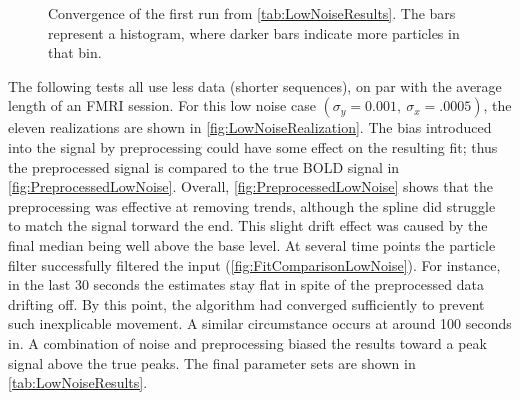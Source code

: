 \begin{figure}
\caption{Convergence of the first run from \autoref{tab:LowNoiseResults}. The bars represent
a histogram, where darker bars indicate more particles in that bin.}
\label{fig:LowNoiseHist}
\end{figure}

The following tests all use less data (shorter sequences), on par with 
the average length of an FMRI session. For this low noise case 
$(\sigma_y = 0.001,\ \sigma_x = .0005)$, the eleven realizations are shown in 
\autoref{fig:LowNoiseRealization}.
The bias introduced into the signal by preprocessing 
could have some effect on the resulting fit; thus the preprocessed signal is compared
to the true BOLD signal in \autoref{fig:PreprocessedLowNoise}.
Overall, \autoref{fig:PreprocessedLowNoise} shows that the preprocessing was 
effective at removing trends, although the spline did struggle to match the signal 
torward the end. This slight drift effect was caused by the final median being 
well above the base
level. 
At several time points the particle filter successfully filtered the input
(\autoref{fig:FitComparisonLowNoise}).
For instance, in the last 30 seconds
the estimates stay flat in spite of the preprocessed data drifting off. By
this point, the algorithm had converged sufficiently to prevent such inexplicable movement.
A similar circumstance occurs at around 100 seconds in. A combination of 
noise and preprocessing biased the results toward a peak signal above the true peaks. 
The final parameter sets are shown in 
\autoref{tab:LowNoiseResults}. 


